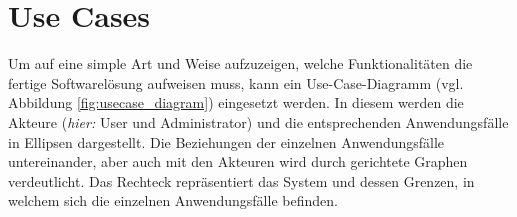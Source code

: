 \section{Use Cases}
Um auf eine simple Art und Weise aufzuzeigen, welche Funktionalitäten die fertige Softwarelösung aufweisen muss, kann ein Use-Case-Diagramm (vgl. Abbildung \ref{fig:usecase_diagram}) eingesetzt werden. In diesem werden die Akteure (\textit{hier:} User und Administrator) und die entsprechenden Anwendungsfälle in Ellipsen dargestellt. Die Beziehungen der einzelnen Anwendungsfälle untereinander, aber auch mit den Akteuren wird durch gerichtete Graphen verdeutlicht. Das Rechteck repräsentiert das System und dessen Grenzen, in welchem sich die einzelnen Anwendungsfälle befinden.